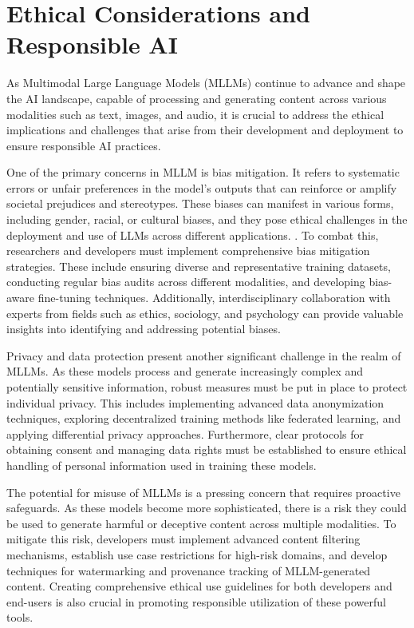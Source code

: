 \chapter{Ethical Considerations and Responsible AI}

As Multimodal Large Language Models (MLLMs) continue to advance and shape the AI landscape, capable of processing and generating content across various modalities such as text, images, and audio, it is crucial to address the ethical implications and challenges that arise from their development and deployment to ensure responsible AI practices\cite{konidena2024ethical}. 

One of the primary concerns in MLLM is bias mitigation. It refers to systematic errors or unfair preferences in the model's outputs that can reinforce or amplify societal prejudices and stereotypes. These biases can manifest in various forms, including gender, racial, or cultural biases, and they pose ethical challenges in the deployment and use of LLMs across different applications.
\cite{peng2024securing}. To combat this, researchers and developers must implement comprehensive bias mitigation strategies\cite{zhang2023mitigating}. These include ensuring diverse and representative training datasets, conducting regular bias\cite{boix2022machine} audits across different modalities\cite{pymetrics2022audit}, and developing bias-aware fine-tuning techniques\cite{kim2024domain}. Additionally, interdisciplinary collaboration with experts from fields such as ethics, sociology, and psychology can provide valuable insights into identifying and addressing potential biases\cite{aquino2023practical}.

Privacy and data protection present another significant challenge in the realm of MLLMs. As these models process and generate increasingly complex and potentially sensitive information, robust measures must be put in place to protect individual privacy\cite{he2024emerged, friha2024llm}. This includes implementing advanced data anonymization techniques, exploring decentralized training methods like federated learning, and applying differential privacy approaches. Furthermore, clear protocols for obtaining consent and managing data rights must be established to ensure ethical handling of personal information used in training these models\cite{mccoy2023ethical}.

The potential for misuse of MLLMs is a pressing concern that requires proactive safeguards. As these models become more sophisticated, there is a risk they could be used to generate harmful or deceptive content across multiple modalities\cite{chen2024trustworthy}. To mitigate this risk, developers must implement advanced content filtering mechanisms, establish use case restrictions for high-risk domains, and develop techniques for watermarking and provenance tracking of MLLM-generated content. Creating comprehensive ethical use guidelines for both developers and end-users is also crucial in promoting responsible utilization of these powerful tools.

